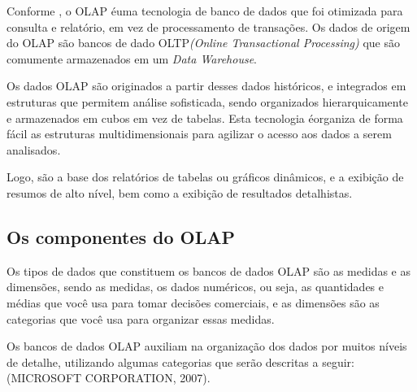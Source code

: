 Conforme \cite{dw-kimball-2013}, o OLAP \'{e}uma tecnologia de banco de dados que foi otimizada para consulta e relat\'{o}rio, em vez de processamento de transa\c{c}\~{o}es. Os dados de origem do OLAP s\~{a}o bancos de dado OLTP\textit{(Online Transactional Processing)} que s\~{a}o comumente armazenados em um \textit{Data Warehouse}.

Os dados OLAP s\~{a}o originados a partir desses dados hist\'{o}ricos, e integrados em estruturas que permitem an\'{a}lise sofisticada, sendo organizados hierarquicamente e armazenados em cubos em vez de tabelas. Esta tecnologia \'{e}organiza de forma f\'{a}cil as estruturas multidimensionais para agilizar o acesso aos dados a serem analisados. 

Logo, s\~{a}o a base dos relat\'{o}rios de tabelas ou gr\'{a}ficos dinâmicos, e a exibi\c{c}\~{a}o de resumos de alto n\'{i}vel, bem como a exibi\c{c}\~{a}o de resultados detalhistas.

\subsection{Os componentes do OLAP}

Os tipos de dados que constituem os bancos de dados OLAP s\~{a}o as medidas e as dimens\~{o}es, sendo as medidas, os dados num\'{e}ricos, ou seja, as quantidades e m\'{e}dias que você usa para tomar decis\~{o}es comerciais, e as dimens\~{o}es s\~{a}o as categorias que você usa para organizar essas medidas.

Os bancos de dados OLAP auxiliam na organiza\c{c}\~{a}o dos dados por muitos n\'{i}veis de detalhe, utilizando algumas categorias que ser\~{a}o descritas a seguir: (MICROSOFT CORPORATION, 2007).

